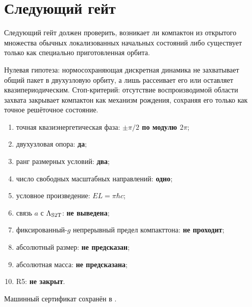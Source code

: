 \section{Следующий гейт}

Следующий гейт
должен проверить, возникает ли компактон из открытого множества обычных
локализованных начальных состояний либо существует только как специально
приготовленная орбита.

Нулевая гипотеза: нормосохраняющая дискретная динамика не захватывает
общий пакет в двухузловую орбиту, а лишь рассеивает его или оставляет
квазипериодическим. Стоп-критерий: отсутствие воспроизводимой области
захвата закрывает компактон как механизм рождения, сохраняя его только как
точное решёточное состояние.

\begin{protocol}
\begin{enumerate}
 \item точная квазиэнергетическая фаза: \textbf{$\pm\pi/2$ по модулю $2\pi$};
 \item двухузловая опора: \textbf{да};
 \item ранг размерных условий: \textbf{два};
 \item число свободных масштабных направлений: \textbf{одно};
 \item условное произведение: \textbf{$EL=\pi\hbar c$};
 \item связь $a$ с $\Lambda_{\rm S2T}$: \textbf{не выведена};
 \item фиксированный-$g$ непрерывный предел компакттона: \textbf{не проходит};
 \item абсолютный размер: \textbf{не предсказан};
 \item абсолютная масса: \textbf{не предсказана};
 \item R5: \textbf{не закрыт}.
\end{enumerate}
\end{protocol}

Машинный сертификат сохранён в
.